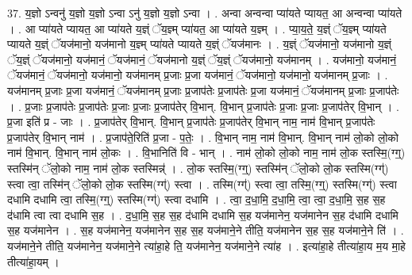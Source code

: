 \documentclass[17pt]{extarticle}
\begin{document}
37. य॒ज्ञो ऽन्वनु॑ य॒ज्ञो य॒ज्ञो ऽन्वा ऽनु॑ य॒ज्ञो य॒ज्ञो ऽन्वा । . अन्वा अन्वन्वा प्या॑यते प्यायत॒ आ अन्वन्वा प्या॑यते । . आ प्या॑यते प्यायत॒ आ प्या॑यते य॒ज्ञ्ं ॅय॒ज्ञ्म् प्या॑यत॒ आ प्या॑यते य॒ज्ञ्म् । . प्या॒य॒ते॒ य॒ज्ञ्ं ॅय॒ज्ञ्म् प्या॑यते प्यायते य॒ज्ञ्ं ॅयज॑मानो॒ यज॑मानो य॒ज्ञ्म् प्या॑यते प्यायते य॒ज्ञ्ं ॅयज॑मानः । . य॒ज्ञ्ं ॅयज॑मानो॒ यज॑मानो य॒ज्ञ्ं ॅय॒ज्ञ्ं ॅयज॑मानो॒ यज॑मानं॒ ॅयज॑मानं॒ ॅयज॑मानो य॒ज्ञ्ं ॅय॒ज्ञ्ं ॅयज॑मानो॒ यज॑मानम् । . यज॑मानो॒ यज॑मानं॒ ॅयज॑मानं॒ ॅयज॑मानो॒ यज॑मानो॒ यज॑मानम् प्र॒जाः प्र॒जा यज॑मानं॒ ॅयज॑मानो॒ यज॑मानो॒ यज॑मानम् प्र॒जाः । . यज॑मानम् प्र॒जाः प्र॒जा यज॑मानं॒ ॅयज॑मानम् प्र॒जाः प्र॒जाप॑तेः प्र॒जाप॑तेः प्र॒जा यज॑मानं॒ ॅयज॑मानम् प्र॒जाः प्र॒जाप॑तेः । . प्र॒जाः प्र॒जाप॑तेः प्र॒जाप॑तेः प्र॒जाः प्र॒जाः प्र॒जाप॑तेर् वि॒भान्. वि॒भान् प्र॒जाप॑तेः प्र॒जाः प्र॒जाः प्र॒जाप॑तेर् वि॒भान् । . प्र॒जा इति॑ प्र - जाः । . प्र॒जाप॑तेर् वि॒भान्. वि॒भान् प्र॒जाप॑तेः प्र॒जाप॑तेर् वि॒भान् नाम॒ नाम॑ वि॒भान् प्र॒जाप॑तेः प्र॒जाप॑तेर् वि॒भान् नाम॑ । . प्र॒जाप॑ते॒रिति॑ प्र॒जा - प॒तेः॒ । . वि॒भान् नाम॒ नाम॑ वि॒भान्. वि॒भान् नाम॑ लो॒को लो॒को नाम॑ वि॒भान्. वि॒भान् नाम॑ लो॒कः । . वि॒भानिति॑ वि - भान् । . नाम॑ लो॒को लो॒को नाम॒ नाम॑ लो॒क स्तस्मि॒(ग्ग्॒) स्तस्मि॑न् ॅलो॒को नाम॒ नाम॑ लो॒क स्तस्मिन्न्॑ । . लो॒क स्तस्मि॒(ग्ग्॒) स्तस्मि॑न् ॅलो॒को लो॒क स्तस्मि(ग्ग्॑) स्त्वा त्वा॒ तस्मि॑न् ॅलो॒को लो॒क स्तस्मि(ग्ग्॑) स्त्वा । . तस्मि(ग्ग्॑) स्त्वा त्वा॒ तस्मि॒(ग्ग्॒) स्तस्मि(ग्ग्॑) स्त्वा दधामि दधामि त्वा॒ तस्मि॒(ग्ग्॒) स्तस्मि(ग्ग्॑) स्त्वा दधामि । . त्वा॒ द॒धा॒मि॒ द॒धा॒मि॒ त्वा॒ त्वा॒ द॒धा॒मि॒ स॒ह स॒ह द॑धामि त्वा त्वा दधामि स॒ह । . द॒धा॒मि॒ स॒ह स॒ह द॑धामि दधामि स॒ह यज॑मानेन॒ यज॑मानेन स॒ह द॑धामि दधामि स॒ह यज॑मानेन । . स॒ह यज॑मानेन॒ यज॑मानेन स॒ह स॒ह यज॑माने॒ने तीति॒ यज॑मानेन स॒ह स॒ह यज॑माने॒ने ति॑ । . यज॑माने॒ने तीति॒ यज॑मानेन॒ यज॑माने॒ने त्या॑हा॒हे ति॒ यज॑मानेन॒ यज॑माने॒ने त्या॑ह । . इत्या॑हा॒हे तीत्या॑हा॒य म॒य मा॒हे तीत्या॑हा॒यम् । \newline
\pagebreak
{}
\end{document}
